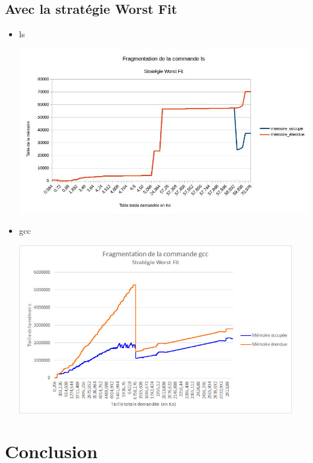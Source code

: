 \documentclass{article}
\begin{document}
\subsection{Avec la stratégie Worst Fit}
\begin{itemize}
	\item ls

\begin{center}	
\includegraphics[width=15cm]{ls_worstfit.jpg}
\end{center}
	\item gcc
	
\begin{center}	
\includegraphics[width=12cm]{gcc_worstfit.jpg}
\end{center}
\end{itemize} 
 
\section{Conclusion}
\end{document}
